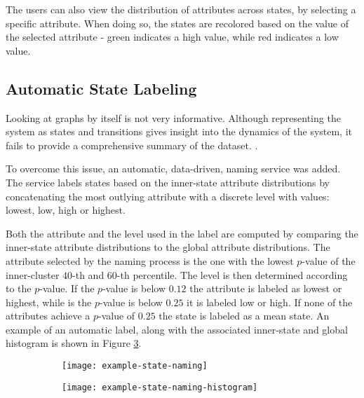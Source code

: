 The users can also view the distribution of attributes across states, by selecting a specific attribute.
When doing so, the states are recolored based on the value of the selected attribute - green indicates
a high value, while red indicates a low value.

\subsection{Automatic State Labeling}

Looking at graphs by itself is not very informative. Although representing the system as states and 
transitions gives insight into the dynamics of the system, it fails to provide a comprehensive summary 
of the dataset. .

To overcome this issue, an automatic, data-driven, naming service was added. The service labels
states based on the inner-state attribute distributions by concatenating the most outlying attribute
with a discrete level with values: lowest, low, high or highest.

Both the attribute and the level used in the label are computed by comparing the inner-state attribute
distributions to the global attribute distributions. The attribute selected by the naming process is
the one with the lowest $p$-value of the inner-cluster $40$-th and $60$-th percentile. The level is
then determined according to the $p$-value. If the $p$-value is below $0.12$ the attribute is labeled
as lowest or highest, while is the $p$-value is below $0.25$ it is labeled low or high. If none of the
attributes achieve a $p$-value of $0.25$ the state is labeled as a mean state. An example of an automatic
label, along with the associated inner-state and global histogram is shown in Figure \ref{fig:example-naming}.

\begin{figure}[h!]
	\centering
	\begin{subfigure}{.48\columnwidth}
	  	\centering
	  	\texttt{[image: example-state-naming]}
  		\caption{\label{fig:example-naming-label}}
	\end{subfigure}
	\begin{subfigure}{.48\columnwidth}
	  	\centering
	  	\texttt{[image: example-state-naming-histogram]}
	  	\caption{\label{fig:example-naming-histogram}}
	\end{subfigure}
	\label{fig:example-naming}
\end{figure}

